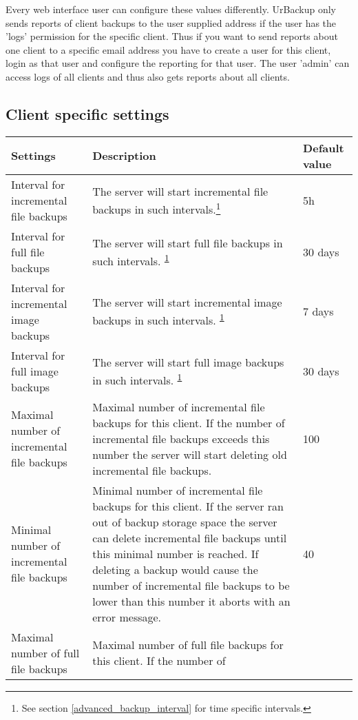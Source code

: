 \documentclass[a4paper,10pt]{article}
\begin{document}
Every web interface user can configure these values differently. UrBackup only sends reports of client backups to the user supplied address if the user has the 'logs' permission for the specific client. Thus if you want to send reports about one client to a specific email address you have to create a user for this client, login as that user and configure the reporting for that user. The user 'admin' can access logs of all clients and thus also gets reports about all clients.

\subsection{Client specific settings}

\begin{longtable}{|p{}|p{}|p{}|}
\hline
Settings  & Description & Default value\\
\hline\hline
Interval for incremental file backups & The server will start incremental file backups in such intervals.\footnote{\label{advanced_backup_interval_note}See section \ref{advanced_backup_interval} for time specific intervals.} & 5h\\
\hline
Interval for full file backups & The server will start full file backups in such intervals. \textsuperscript{\ref{advanced_backup_interval_note}} & 30 days\\
\hline
Interval for incremental image backups & The server will start incremental image backups in such intervals. \textsuperscript{\ref{advanced_backup_interval_note}} & 7 days\\
\hline
Interval for full image backups & The server will start full image backups in such intervals. \textsuperscript{\ref{advanced_backup_interval_note}} & 30 days\\
\hline
Maximal number of incremental file backups & Maximal number of incremental file backups for this client. If the number of
 incremental file backups exceeds this number the server will start deleting old incremental file backups. & 100\\
\hline 
Minimal number of incremental file backups & Minimal number of incremental file backups for this client. If the server ran out of backup storage space the server can delete incremental file backups until this minimal number is reached. If deleting a backup would cause the number of incremental file backups to be lower than this number it aborts with an error message. & 40\\
\hline
Maximal number of full file backups & Maximal number of full file backups for this client. If the number of

\end{longtable}
\end{document}
